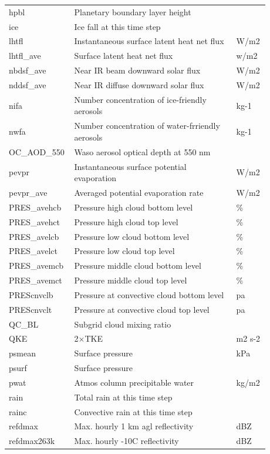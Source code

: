 \documentclass[11pt,fleqn]{report}              %
\begin{document}
\begin{enumerate}
\begin{enumerate}
{\begin{longtable}{p{0.17\linewidth} | p{0.6\linewidth} | p{0.11\linewidth} }
hpbl  & Planetary boundary layer height  & \\
ice  & Ice fall at this time step & \\
lhtfl  & Instantaneous surface latent heat net flux & W/m2  \\
lhtfl\_ave  & Surface latent heat net flux & w/m2 \\
nbdsf\_ave  & Near IR beam downward solar flux & W/m2 \\
nddsf\_ave  & Near IR diffuse downward solar flux & W/m2 \\
nifa & Number concentration of ice-friendly aerosols & kg-1 \\
nwfa  & Number concentration of water-frriendly aerosols & kg-1 \\ 
OC\_AOD\_550  & Waso aerosol optical depth at 550 nm  & \\
pevpr  & Instantaneous surface potential evaporation & W/m2  \\
pevpr\_ave  & Averaged potential evaporation rate & W/m2  \\
PRES\_avehcb  & Pressure high cloud bottom level & \%  \\
PRES\_avehct  & Pressure high cloud top level & \% \\
PRES\_avelcb  & Pressure low cloud bottom level & \%  \\
PRES\_avelct  & Pressure low cloud top level & \% \\
PRES\_avemcb  & Pressure middle cloud bottom level & \% \\
PRES\_avemct  & Pressure middle cloud top level & \% \\
PREScnvclb  & Pressure at convective cloud bottom level & pa  \\
PREScnvclt  & Pressure at convective cloud top level & pa  \\
QC\_BL  & Subgrid cloud mixing ratio & \\
QKE & 2$\times$TKE & m2 s-2 \\
psmean &  Surface pressure & kPa  \\ 
psurf  & Surface pressure  & \\
pwat  & Atmos column precipitable water & kg/m2  \\
rain  & Total rain at this time step & \\
rainc  & Convective rain at this time step & \\
refdmax  & Max. hourly 1 km agl reflectivity & dBZ  \\
refdmax263k & Max. hourly -10C reflectivity & dBZ  \\ 

\end{longtable}}
\end{enumerate}
\end{enumerate}
\end{document}
